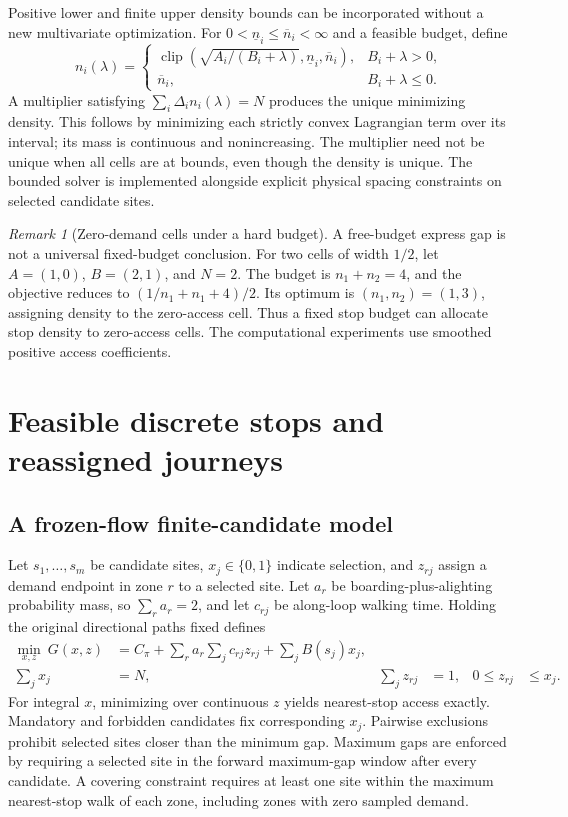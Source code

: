 \documentclass[11pt]{article}
\theoremstyle{remark}\newtheorem{remark}[theorem]{Remark}
\newcommand{\clip}{\operatorname{clip}}
\begin{document}
Positive lower and finite upper density bounds can be incorporated without a new multivariate optimization. For $0<\underline n_i\leq\overline n_i<\infty$ and a feasible budget, define
\begin{equation}
n_i(\lambda)=
\begin{cases}
\clip\left(\sqrt{A_i/(B_i+\lambda)},\underline n_i,\overline n_i\right),&B_i+\lambda>0,\\
\overline n_i,&B_i+\lambda\leq0.
\end{cases}\label{eq:bounded}
\end{equation}
A multiplier satisfying $\sum_i\Delta_i n_i(\lambda)=N$ produces the unique minimizing density. This follows by minimizing each strictly convex Lagrangian term over its interval; its mass is continuous and nonincreasing. The multiplier need not be unique when all cells are at bounds, even though the density is unique. The bounded solver is implemented alongside explicit physical spacing constraints on selected candidate sites.

\begin{remark}[Zero-demand cells under a hard budget]
A free-budget express gap is not a universal fixed-budget conclusion. For two cells of width $1/2$, let $A=(1,0)$, $B=(2,1)$, and $N=2$. The budget is $n_1+n_2=4$, and the objective reduces to $(1/n_1+n_1+4)/2$. Its optimum is $(n_1,n_2)=(1,3)$, assigning density to the zero-access cell. Thus a fixed stop budget can allocate stop density to zero-access cells. The computational experiments use smoothed positive access coefficients.
\end{remark}

\section{Feasible discrete stops and reassigned journeys}\label{sec:discrete}
\subsection{A frozen-flow finite-candidate model}
Let $s_1,\ldots,s_m$ be candidate sites, $x_j\in\{0,1\}$ indicate selection, and $z_{rj}$ assign a demand endpoint in zone $r$ to a selected site. Let $a_r$ be boarding-plus-alighting probability mass, so $\sum_r a_r=2$, and let $c_{rj}$ be along-loop walking time. Holding the original directional paths fixed defines
\begin{align}
\min_{x,z}\ G(x,z)&=C_\pi+\sum_r a_r\sum_j c_{rj}z_{rj}+\sum_j B(s_j)x_j,\label{eq:milp}\\
\sum_j x_j&=N, &\sum_j z_{rj}&=1, &0\leq z_{rj}&\leq x_j.\nonumber
\end{align}
For integral $x$, minimizing over continuous $z$ yields nearest-stop access exactly. Mandatory and forbidden candidates fix corresponding $x_j$. Pairwise exclusions prohibit selected sites closer than the minimum gap. Maximum gaps are enforced by requiring a selected site in the forward maximum-gap window after every candidate. A covering constraint requires at least one site within the maximum nearest-stop walk of each zone, including zones with zero sampled demand.
\end{document}
